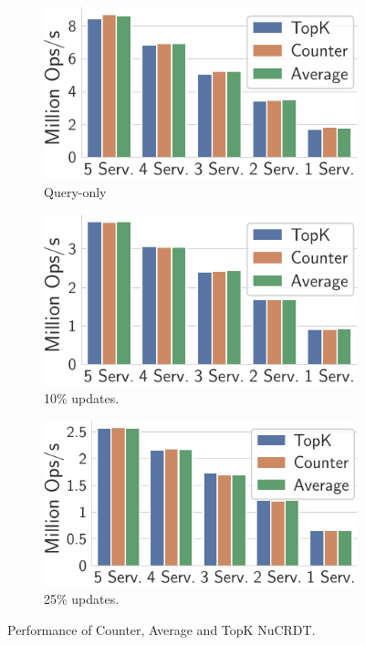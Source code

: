 \documentclass[sigplan,twocolumn,review,anonymous]{acmart}
\begin{document}
\begin{figure}
	\centering
	\begin{subfigure}{.325\linewidth}
		\includegraphics[width=1\linewidth]{singleQuery/n_servers_0_upd_5b}
		\caption{Query-only}
		\label{fig:crdts_0_upd}
	\end{subfigure}%
	\begin{subfigure}{.325\linewidth}
		\includegraphics[width=1\linewidth]{singleQuery/n_servers_0_1_upd_5b}
		\caption{10\% updates.}
		\label{fig:crdts_10_upd}
	\end{subfigure}%
	\begin{subfigure}{.34\linewidth}
	\includegraphics[width=1\linewidth]{singleQuery/n_servers_0_25_upd_5b}
	\caption{25\% updates.}
	\label{fig:crdts_25-upd}
	\end{subfigure}%
	\vspace*{-5pt}
	\caption{Performance of Counter, Average and TopK NuCRDT.}
	\label{fig:crdts:perf}
	\vspace*{-15pt}
\end{figure}
\end{document}
